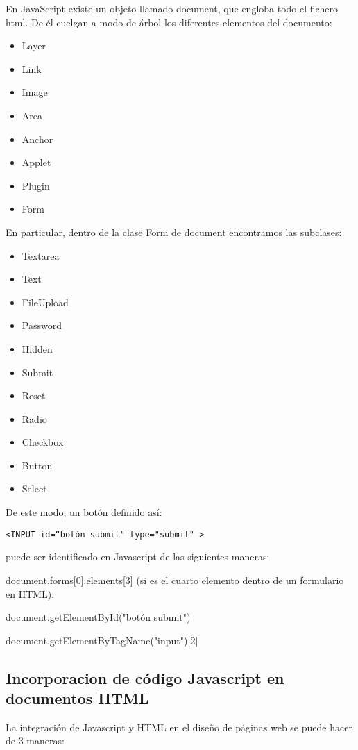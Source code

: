 \documentclass{apuntes}
\begin{document}
\begin{enumerate}
En JavaScript existe un objeto llamado document, que engloba todo el fichero html. De él cuelgan a modo de árbol los diferentes elementos del documento:
\begin {itemize}
\item Layer
\item Link
\item Image
\item Area
\item Anchor
\item Applet
\item Plugin
\item Form
\end{itemize}
En particular, dentro de la clase Form de document encontramos las subclases:

\begin{itemize}
\item Textarea
\item Text
\item FileUpload
\item Password
\item Hidden
\item Submit
\item Reset
\item Radio
\item Checkbox
\item Button
\item Select
\end{itemize}

De este modo, un botón definido así:

\begin{verbatim}
<INPUT id=“botón submit" type="submit" >
\end{verbatim}
puede ser identificado en Javascript de las siguientes maneras:

document.forms[0].elements[3] (si es el cuarto elemento dentro de un formulario en HTML).

document.getElementById("botón submit")

document.getElementByTagName("input")[2]



\end{enumerate}

\subsection{Incorporacion de código Javascript en documentos HTML}

La integración de Javascript y HTML en el diseño de páginas web se puede hacer de 3 maneras:
\end{document}
